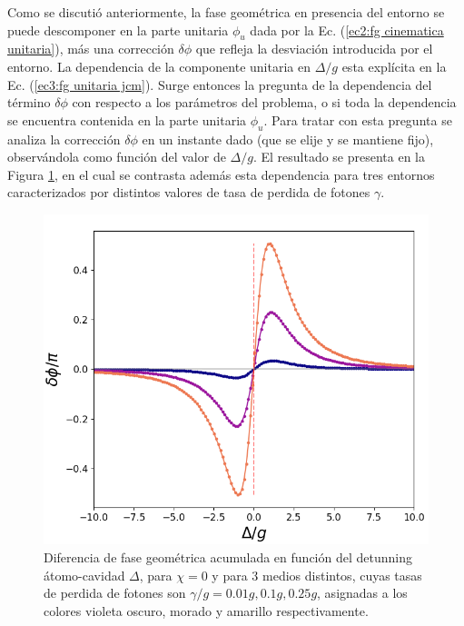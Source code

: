Como se discutió anteriormente, la fase geométrica en presencia del entorno se puede descomponer en la parte unitaria $\phi_u$ dada por la Ec. (\ref{ec2:fg cinematica unitaria}), más una corrección $\delta\phi$ que refleja la desviación introducida por el entorno. La dependencia de la componente unitaria en $\Delta/g$ esta explícita en la Ec. (\ref{ec3:fg unitaria jcm}). Surge entonces la pregunta de la dependencia del término $\delta\phi$ con respecto a los parámetros del problema, o si toda la dependencia se encuentra contenida en la parte unitaria $\phi_u$. Para tratar con esta pregunta se analiza la corrección $\delta\phi$ en un instante dado (que se elije y se mantiene fijo), observándola como función del valor de $\Delta/g$. El resultado se presenta en la Figura \ref{fig3:robustez 0}, en el cual se contrasta además esta dependencia para tres entornos caracterizados por distintos valores de tasa de perdida de fotones $\gamma$.
\begin{figure}[h]
    \begin{minipage}[c]{0.67\textwidth}
        \includegraphics[width=\textwidth]{figuras/ch3/robustez.png}
    \end{minipage}\hfill
    \begin{minipage}[c]{0.3\textwidth}
    \caption{Diferencia de fase geométrica acumulada en función del detunning átomo-cavidad $\Delta$, para $\chi=0$ y para 3 medios distintos, cuyas tasas de perdida de fotones son $\gamma/g=0.01g,0.1g,0.25g$, asignadas a los colores violeta oscuro, morado y amarillo respectivamente.}
    \label{fig3:robustez 0}
  \end{minipage}
\end{figure}
